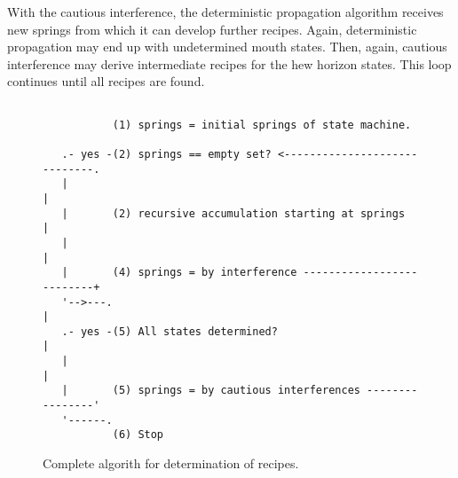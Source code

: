 \documentclass[12pt,a4paper]{scrartcl}
\begin{document}
With the cautious interference, the deterministic propagation algorithm
receives new springs from which it can develop further recipes. Again, deterministic
propagation may end up with undetermined mouth states. Then, again, cautious
interference may derive intermediate recipes for the hew horizon states. This
loop continues until all recipes are found. 


\begin{figure}[htbp] \leavevmode \label{fig:algo-2}
\begin{verbatim}
   
           (1) springs = initial springs of state machine.

   .- yes -(2) springs == empty set? <-----------------------------.
   |                                                               |
   |       (2) recursive accumulation starting at springs          |
   |                                                               |
   |       (4) springs = by interference --------------------------+
   '-->---.                                                        |
   .- yes -(5) All states determined?                              |
   |                                                               |
   |       (5) springs = by cautious interferences ----------------'
   '------.
           (6) Stop 

\end{verbatim}

\caption{Complete algorith for determination of recipes.}
\end{figure}
\end{document}
